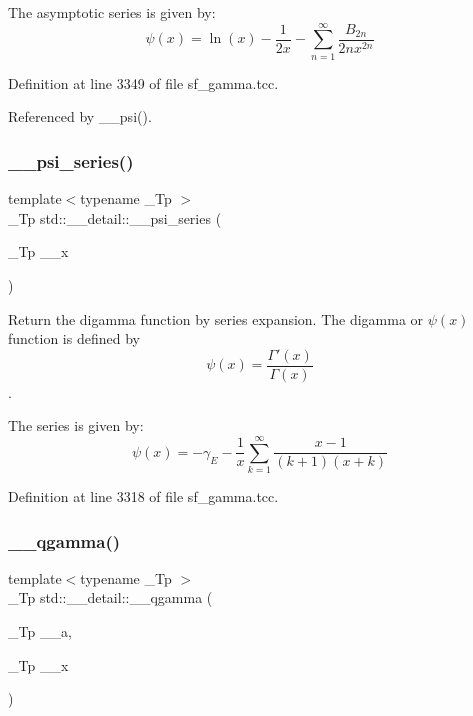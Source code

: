 The asymptotic series is given by\+: \[ \psi(x) = \ln(x) - \frac{1}{2x} - \sum_{n=1}^{\infty} \frac{B_{2n}}{2 n x^{2n}} \] 

Definition at line 3349 of file sf\+\_\+gamma.\+tcc.



Referenced by \+\_\+\+\_\+psi().

\mbox{\label{namespacestd_1_1____detail_a378e78e1c3c08b8f146acf32a26e831a}} 
\subsubsection{\texorpdfstring{\+\_\+\+\_\+psi\+\_\+series()}{\_\_psi\_series()}}
{\footnotesize\ttfamily template$<$typename \+\_\+\+Tp $>$ \\
\+\_\+\+Tp std\+::\+\_\+\+\_\+detail\+::\+\_\+\+\_\+psi\+\_\+series (\begin{DoxyParamCaption}\item[{\+\_\+\+Tp}]{\+\_\+\+\_\+x }\end{DoxyParamCaption})}



Return the digamma function by series expansion. The digamma or $ \psi(x) $ function is defined by \[ \psi(x) = \frac{\Gamma'(x)}{\Gamma(x)} \]. 

The series is given by\+: \[ \psi(x) = -\gamma_E - \frac{1}{x} \sum_{k=1}^{\infty} \frac{x - 1}{(k + 1)(x + k)} \] 

Definition at line 3318 of file sf\+\_\+gamma.\+tcc.

\mbox{\label{namespacestd_1_1____detail_acaac94504608c15edb7d96884ac1dc23}} 
\subsubsection{\texorpdfstring{\+\_\+\+\_\+qgamma()}{\_\_qgamma()}}
{\footnotesize\ttfamily template$<$typename \+\_\+\+Tp $>$ \\
\+\_\+\+Tp std\+::\+\_\+\+\_\+detail\+::\+\_\+\+\_\+qgamma (\begin{DoxyParamCaption}\item[{\+\_\+\+Tp}]{\+\_\+\+\_\+a,  }\item[{\+\_\+\+Tp}]{\+\_\+\+\_\+x }\end{DoxyParamCaption})}



